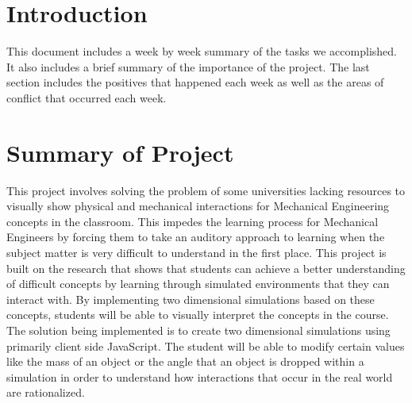 \documentclass[onecolumn, draftclsnofoot,10pt, compsoc]{IEEEtran}
\begin{document}
\newpage
{}
\tableofcontents
\clearpage



\section{Introduction}
This document includes a week by week summary of the tasks we accomplished. It also includes a brief summary of the importance of the project. The last section includes the positives that happened each week as well as the areas of conflict that occurred each week.

\section{Summary of Project}
This project involves solving the problem of some universities lacking resources to visually show physical and mechanical interactions for Mechanical Engineering concepts in the classroom. This impedes the learning process for Mechanical Engineers by forcing them to take an auditory approach to learning when the subject matter is very difficult to understand in the first place. This project is built on the research that shows that students can achieve a better understanding of difficult concepts by learning through simulated environments that they can interact with. By implementing two dimensional simulations based on these concepts, students will be able to visually interpret the concepts in the course. The solution being implemented is to create two dimensional simulations using primarily client side JavaScript. The student will be able to modify certain values like the mass of an object or the angle that an object is dropped within a simulation in order to understand how interactions that occur in the real world are rationalized.  
\end{document}
